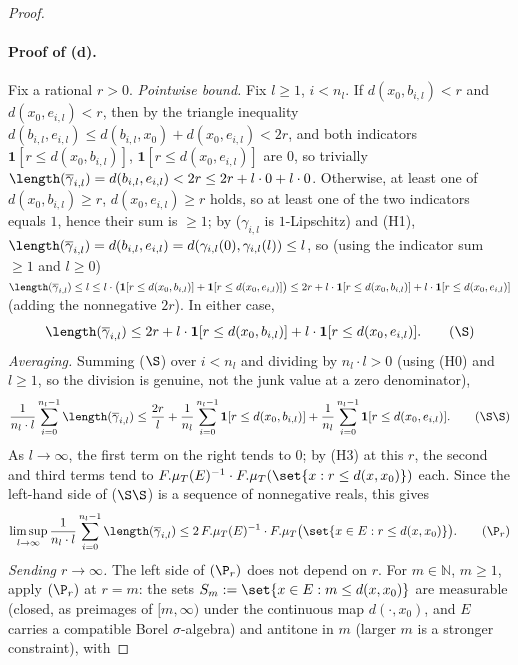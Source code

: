 \begin{proof}
  \paragraph{Proof of (d).} Fix a rational $r>0$. \emph{Pointwise bound.} Fix $l\ge1$, $i<n_l$. If
  $d(x_0,b_{i,l})<r$ and $d(x_0,e_{i,l})<r$, then by the triangle inequality
  $d(b_{i,l},e_{i,l}) \le d(b_{i,l},x_0)+d(x_0,e_{i,l}) < 2r$, and both indicators
  $\mathbf 1[r\le d(x_0,b_{i,l})]$, $\mathbf 1[r\le d(x_0,e_{i,l})]$ are $0$, so trivially
  $\length(\overline\gamma_{i,l}) = d(b_{i,l},e_{i,l}) < 2r \le 2r + l\cdot 0 + l\cdot 0$.
  Otherwise, at least one of $d(x_0,b_{i,l})\ge r$, $d(x_0,e_{i,l})\ge r$ holds, so at least one of
  the two indicators equals $1$, hence their sum is $\ge1$; by 
  ($\gamma_{i,l}$ is $1$-Lipschitz) and (H1), $\length(\overline\gamma_{i,l}) = d(b_{i,l},e_{i,l})
  = d(\gamma_{i,l}(0),\gamma_{i,l}(l)) \le l$, so (using the indicator sum $\ge1$ and $l\ge0$)
  $\length(\overline\gamma_{i,l}) \le l \le l\cdot\bigl(\mathbf1[r\le d(x_0,b_{i,l})]+
  \mathbf1[r\le d(x_0,e_{i,l})]\bigr) \le 2r + l\cdot\mathbf1[r\le d(x_0,b_{i,l})]+
  l\cdot\mathbf1[r\le d(x_0,e_{i,l})]$ (adding the nonnegative $2r$). In either case,
  \[
    \length(\overline\gamma_{i,l}) \le 2r + l\cdot\mathbf1[r\le d(x_0,b_{i,l})]
      + l\cdot\mathbf1[r\le d(x_0,e_{i,l})]
    . \tag{$\S$}
  \]
  \emph{Averaging.} Summing ($\S$) over $i<n_l$ and dividing by $n_l\cdot l>0$ (using (H0) and
  $l\ge1$, so the division is genuine, not the junk value at a zero denominator),
  \[
    \frac1{n_l\cdot l}\sum_{i=0}^{n_l-1}\length(\overline\gamma_{i,l})
    \le \frac{2r}{l} + \frac1{n_l}\sum_{i=0}^{n_l-1}\mathbf1[r\le d(x_0,b_{i,l})]
      + \frac1{n_l}\sum_{i=0}^{n_l-1}\mathbf1[r\le d(x_0,e_{i,l})]
    . \tag{$\S\S$}
  \]
  As $l\to\infty$, the first term on the right tends to $0$; by (H3) at this $r$, the second and
  third terms tend to $F.\mu_T(E)^{-1}\cdot F.\mu_T(\set{x:r\le d(x,x_0)})$ each. Since the
  left-hand side of ($\S\S$) is a sequence of nonnegative reals, this gives
  \[
    \limsup_{l\to\infty} \frac1{n_l\cdot l}\sum_{i=0}^{n_l-1}\length(\overline\gamma_{i,l})
    \le 2\,F.\mu_T(E)^{-1}\cdot F.\mu_T\bigl(\set{x\in E: r\le d(x,x_0)}\bigr)
    . \tag{$\P_r$}
  \]
  \emph{Sending $r\to\infty$.} The left side of $(\P_r)$ does not depend on $r$. For $m\in\mathbb N$,
  $m\ge1$, apply $(\P_r)$ at $r=m$: the sets $S_m := \set{x\in E: m\le d(x,x_0)}$ are measurable
  (closed, as preimages of $[m,\infty)$ under the continuous map $d(\cdot,x_0)$, and $E$ carries a
  compatible Borel $\sigma$-algebra) and antitone in $m$ (larger $m$ is a stronger constraint), with

\end{proof}
